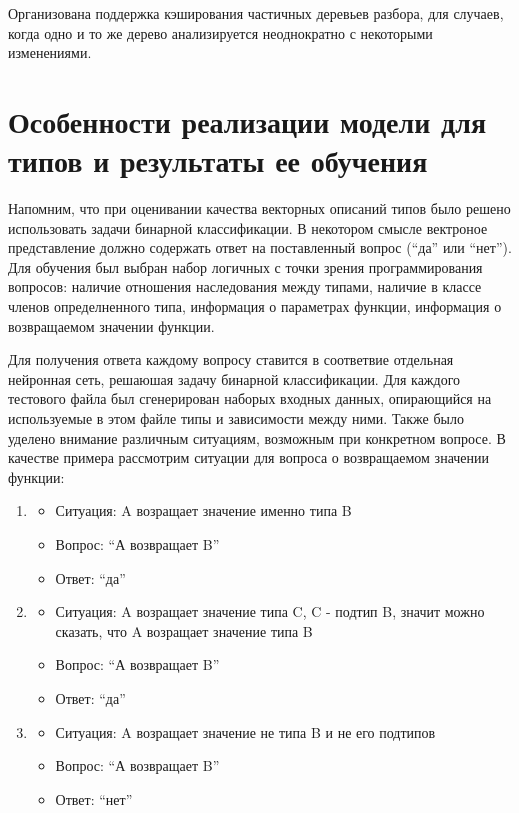 \documentclass[times,specification,annotation]{itmo-student-thesis}
\begin{document}
Организована поддержка кэширования частичных деревьев разбора, для случаев, когда одно и то же дерево анализируется неоднократно с некоторыми изменениями.

\section{Особенности реализации модели для типов и результаты ее обучения}
Напомним, что при оценивании качества векторных описаний типов было решено использовать задачи бинарной классификации. В некотором смысле вектроное представление должно содержать ответ на поставленный вопрос (``да'' или ``нет''). Для обучения был выбран набор логичных с точки зрения программирования вопросов: наличие отношения наследования между типами, наличие в классе членов определненного типа, информация о параметрах функции, информация о возвращаемом значении функции.

Для получения ответа каждому вопросу ставится в соответвие отдельная нейронная сеть, решаюшая задачу бинарной классификации. Для каждого тестового файла был сгенерирован наборых входных данных, опирающийся на используемые в этом файле типы и зависимости между ними. Также было уделено внимание различным ситуациям, возможным при конкретном вопросе. В качестве примера рассмотрим ситуации для вопроса о возвращаемом значении функции:
\begin{enumerate}
    \item
        \begin{itemize}
            \item Ситуация: A возращает значение именно типа B
            \item Вопрос: ``А возвращает B''
            \item Ответ: ``да''
        \end{itemize}
    \item 
        \begin{itemize}
            \item Ситуация: A возращает значение типа C, C - подтип B, значит можно сказать, что A возращает значение типа B
            \item Вопрос: ``А возвращает B''
            \item Ответ: ``да''
        \end{itemize}
    \item 
        \begin{itemize}
            \item Ситуация: A возращает значение не типа B и не его подтипов
            \item Вопрос: ``А возвращает B''
            \item Ответ: ``нет''
        \end{itemize}
\end{enumerate}
\end{document}
